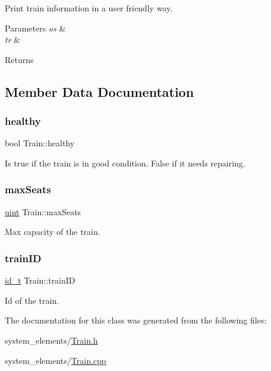 Print train information in a user friendly way.


\begin{DoxyParams}{Parameters}
{\em os} & \\
\hline
{\em tr} & \\
\hline
\end{DoxyParams}
\begin{DoxyReturn}{Returns}

\end{DoxyReturn}


\subsection{Member Data Documentation}
\mbox{\label{classTrain_a46d816dfcfd42a00fb3f20ac0a15e567}} 
\subsubsection{\texorpdfstring{healthy}{healthy}}
{\footnotesize\ttfamily bool Train\+::healthy\hspace{0.3cm}{\ttfamily [protected]}}

Is true if the train is in good condition. False if it needs repairing. \mbox{\label{classTrain_a2954421b3beb871526ca169beca4c430}} 
\subsubsection{\texorpdfstring{max\+Seats}{maxSeats}}
{\footnotesize\ttfamily \mbox{\hyperlink{project__utils_8h_a91ad9478d81a7aaf2593e8d9c3d06a14}{uint}} Train\+::max\+Seats\hspace{0.3cm}{\ttfamily [protected]}}

Max capacity of the train. \mbox{\label{classTrain_a8f77f693153f35b33284699d8058bf0a}} 
\subsubsection{\texorpdfstring{train\+ID}{trainID}}
{\footnotesize\ttfamily \mbox{\hyperlink{project__utils_8h_a8f3a969054ad2200720b96e7e23dd4e1}{id\+\_\+t}} Train\+::train\+ID\hspace{0.3cm}{\ttfamily [protected]}}

Id of the train. 

The documentation for this class was generated from the following files\+:\begin{DoxyCompactItemize}
\item 
system\+\_\+elements/\mbox{\hyperlink{Train_8h}{Train.\+h}}\item 
system\+\_\+elements/\mbox{\hyperlink{Train_8cpp}{Train.\+cpp}}\end{DoxyCompactItemize}
